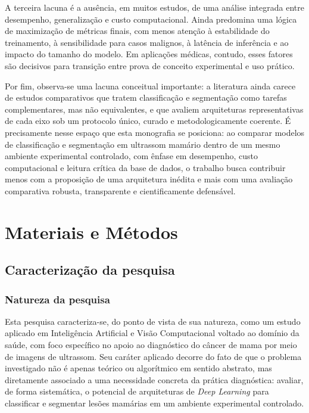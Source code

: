 \documentclass[tcc,capa]{texufpel}
\begin{document}
A terceira lacuna é a ausência, em muitos estudos, de uma análise integrada entre desempenho, generalização e custo computacional. Ainda predomina uma lógica de maximização de métricas finais, com menos atenção à estabilidade do treinamento, à sensibilidade para casos malignos, à latência de inferência e ao impacto do tamanho do modelo. Em aplicações médicas, contudo, esses fatores são decisivos para transição entre prova de conceito experimental e uso prático. \cite{Dan2024,Rayed2024SegSurvey}

Por fim, observa-se uma lacuna conceitual importante: a literatura ainda carece de estudos comparativos que tratem classificação e segmentação como tarefas complementares, mas não equivalentes, e que avaliem arquiteturas representativas de cada eixo sob um protocolo único, curado e metodologicamente coerente. É precisamente nesse espaço que esta monografia se posiciona: ao comparar modelos de classificação e segmentação em ultrassom mamário dentro de um mesmo ambiente experimental controlado, com ênfase em desempenho, custo computacional e leitura crítica da base de dados, o trabalho busca contribuir menos com a proposição de uma arquitetura inédita e mais com uma avaliação comparativa robusta, transparente e cientificamente defensável. \cite{Dan2024,AumenteMaestro2025,Pawlowska2023}

\chapter{Materiais e Métodos}

\section{Caracterização da pesquisa}

\subsection{Natureza da pesquisa}

Esta pesquisa caracteriza-se, do ponto de vista de sua natureza, como um estudo aplicado em Inteligência Artificial e Visão Computacional voltado ao domínio da saúde, com foco específico no apoio ao diagnóstico do câncer de mama por meio de imagens de ultrassom. Seu caráter aplicado decorre do fato de que o problema investigado não é apenas teórico ou algorítmico em sentido abstrato, mas diretamente associado a uma necessidade concreta da prática diagnóstica: avaliar, de forma sistemática, o potencial de arquiteturas de \textit{Deep Learning} para classificar e segmentar lesões mamárias em um ambiente experimental controlado.
\end{document}
